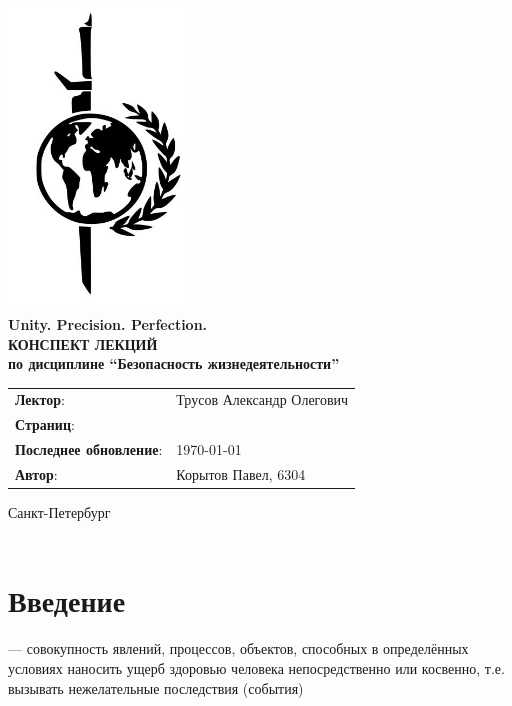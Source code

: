 \documentclass[a4paper, 14pt]{extarticle}
\begin{document}
\begin{titlepage}
    {\centering
        {\bfseries
            \includegraphics[height=8cm]{../res/logo.jpeg}\\
            Unity. Precision. Perfection.\\
            \vspace{3.5cm}
            \uppercase{Конспект лекций} \\
            по дисциплине \enquote{Безопасность жизнедеятельности}\\
        }
        \vspace{\fill}
    }
    \begin{tabular}{l l}
        \textbf{Лектор}: & Трусов Александр Олегович\\
        \textbf{Страниц}: &\pageref{LastPage}\\
        \textbf{Последнее обновление}: & \today{}\\ 
        \textbf{Автор}: & Корытов Павел, 6304\\
    \end{tabular}

    \vspace{2cm}
    {\centering
        Санкт-Петербург \\
        \the\year\\
    }
\end{titlepage}

\tableofcontents
\newpage

\section{Введение}
 --- совокупность явлений, процессов, объектов, способных в определённых условиях наносить ущерб здоровью человека непосредственно или косвенно, т.е. вызывать нежелательные последствия (события)
\end{document}
